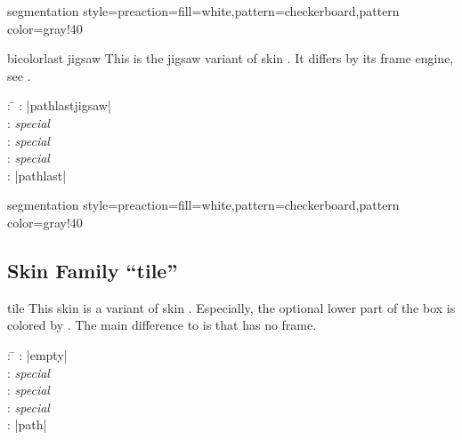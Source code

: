 \begin{dispExample*}{segmentation style={preaction={fill=white},pattern=checkerboard,pattern color=gray!40}}
\end{dispExample*}


\clearpage
\begin{docSkin}[doc new=2021-05-21]{bicolorlast jigsaw}
  This is the jigsaw variant of skin .
  It differs by its frame engine, see .
\begin{tcolorbox}[skintable=bicolorlast jigsaw]
  \begin{tabbing}
    : \=\kill
    :           \> |pathlastjigsaw|\\
    : \> \emph{special}\\ 
    :        \> \emph{special}\\
    :    \> \emph{special}\\
    :           \> |pathlast|
  \end{tabbing}
\end{tcolorbox}
\end{docSkin}


\begin{dispExample*}{segmentation style={preaction={fill=white},pattern=checkerboard,pattern color=gray!40}}
\end{dispExample*}



\clearpage
\subsection{Skin Family \enquote{tile}}
\begin{docSkin}[doc new=2016-02-25]{tile}
  This skin is a variant of skin . Especially, the
  optional lower part of the box is colored by .
  The main difference to  is that  has no
  frame.
\begin{tcolorbox}[skintable=tile]
  \begin{tabbing}
    : \=\kill
    :           \> |empty|\\
    : \> \emph{special}\\ 
    :        \> \emph{special}\\
    :    \> \emph{special}\\
    :           \> |path|
  \end{tabbing}
\end{tcolorbox}
\end{docSkin}

